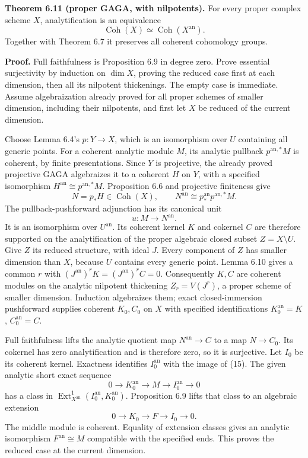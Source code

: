 \documentclass[11pt]{article}
\begin{document}
\textbf{Theorem 6.11 (proper GAGA, with nilpotents).} For every proper
complex scheme \(X\), analytification is an equivalence \[
\operatorname{Coh}(X)\simeq\operatorname{Coh}(X^{\mathrm{an}}).
\] Together with Theorem 6.7 it preserves all coherent cohomology
groups.

\textbf{Proof.} Full faithfulness is Proposition 6.9 in degree zero.
Prove essential surjectivity by induction on \(\dim X\), proving the
reduced case first at each dimension, then all its nilpotent
thickenings. The empty case is immediate. Assume algebraization already
proved for all proper schemes of smaller dimension, including their
nilpotents, and first let \(X\) be reduced of the current dimension.

Choose Lemma 6.4's \(p:Y\to X\), which is an isomorphism over \(U\)
containing all generic points. For a coherent analytic module \(M\), its
analytic pullback \(p^{\mathrm{an},*}M\) is coherent, by finite
presentations. Since \(Y\) is projective, the already proved projective
GAGA algebraizes it to a coherent \(H\) on \(Y\), with a specified
isomorphism \(H^{\mathrm{an}}\cong p^{\mathrm{an},*}M\). Proposition 6.6
and projective finiteness give \[
N=p_*H\in\operatorname{Coh}(X),\qquad
N^{\mathrm{an}}\cong p^{\mathrm{an}}_*p^{\mathrm{an},*}M.
\] The pullback-pushforward adjunction has its canonical unit \[
u:M\longrightarrow N^{\mathrm{an}}.
\tag{15}
\] It is an isomorphism over \(U^{\mathrm{an}}\). Its coherent kernel
\(K\) and cokernel \(C\) are therefore supported on the analytification
of the proper algebraic closed subset \(Z=X\setminus U\). Give \(Z\) its
reduced structure, with ideal \(J\). Every component of \(Z\) has
smaller dimension than \(X\), because \(U\) contains every generic
point. Lemma 6.10 gives a common \(r\) with
\((J^{\mathrm{an}})^rK=(J^{\mathrm{an}})^rC=0\). Consequently \(K,C\)
are coherent modules on the analytic nilpotent thickening
\(Z_r=V(J^r)\), a proper scheme of smaller dimension. Induction
algebraizes them; exact closed-immersion pushforward supplies coherent
\(K_0,C_0\) on \(X\) with specified identifications
\(K_0^{\mathrm{an}}=K\), \(C_0^{\mathrm{an}}=C\).

Full faithfulness lifts the analytic quotient map
\(N^{\mathrm{an}}\to C\) to a map \(N\to C_0\). Its cokernel has zero
analytification and is therefore zero, so it is surjective. Let \(I_0\)
be its coherent kernel. Exactness identifies \(I_0^{\mathrm{an}}\) with
the image of (15). The given analytic short exact sequence \[
0\to K_0^{\mathrm{an}}\to M\to I_0^{\mathrm{an}}\to0
\] has a class in
\(\operatorname{Ext}^1_{X^{\mathrm{an}}}(I_0^{\mathrm{an}},K_0^{\mathrm{an}})\).
Proposition 6.9 lifts that class to an algebraic extension \[
0\to K_0\to F\to I_0\to0.
\] The middle module is coherent. Equality of extension classes gives an
analytic isomorphism \(F^{\mathrm{an}}\cong M\) compatible with the
specified ends. This proves the reduced case at the current dimension.
\end{document}
